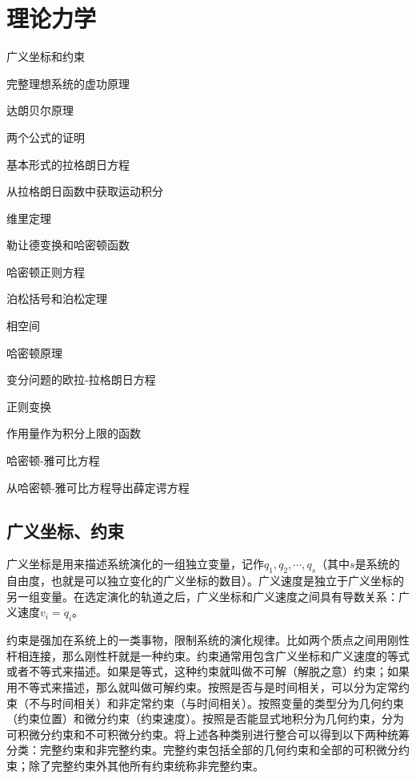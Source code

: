 \chapter{理论力学}
    \begin{introduction}
        \item 广义坐标和约束
        \item 完整理想系统的虚功原理
        \item 达朗贝尔原理
        \item 两个公式的证明
        \item 基本形式的拉格朗日方程
        \item 从拉格朗日函数中获取运动积分
        \item 维里定理
        \item 勒让德变换和哈密顿函数
        \item 哈密顿正则方程
        \item 泊松括号和泊松定理
        \item 相空间
        \item 哈密顿原理
        \item 变分问题的欧拉-拉格朗日方程
        \item 正则变换
        \item 作用量作为积分上限的函数
        \item 哈密顿-雅可比方程
        \item 从哈密顿-雅可比方程导出薛定谔方程
    \end{introduction}

    \section{广义坐标、约束}
    广义坐标是用来描述系统演化的一组独立变量，记作$q_1,q_2,\cdots,q_s$（其中$s$是系统的自由度，也就是可以独立变化的广义坐标的数目）。广义速度是独立于广义坐标的另一组变量。在选定演化的轨道之后，广义坐标和广义速度之间具有导数关系：广义速度$v_i=\dot{q}_i$。

    约束是强加在系统上的一类事物，限制系统的演化规律。比如两个质点之间用刚性杆相连接，那么刚性杆就是一种约束。约束通常用包含广义坐标和广义速度的等式或者不等式来描述。如果是等式，这种约束就叫做不可解（解脱之意）约束；如果用不等式来描述，那么就叫做可解约束。按照是否与是时间相关，可以分为定常约束（不与时间相关）和非定常约束（与时间相关）。按照变量的类型分为几何约束（约束位置）和微分约束（约束速度）。按照是否能显式地积分为几何约束，分为可积微分约束和不可积微分约束。将上述各种类别进行整合可以得到以下两种统筹分类：完整约束和非完整约束。完整约束包括全部的几何约束和全部的可积微分约束；除了完整约束外其他所有约束统称非完整约束。

